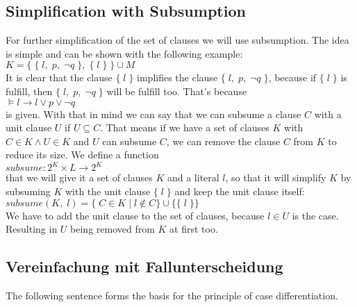 \subsection{Simplification with Subsumption}
For further simplification of the set of clauses we will use subsumption. The idea is simple and can be shown with the following example:
\\
\hspace*{1.3cm}
$K = \{\; \{\; l,\; p,\; \neg q \;\},\; \{\; l\; \}\; \} \cup M$
\\[0.2cm]
It is clear that the clause $\{\; l\; \}$ implifies the clause $\{\; l,\; p,\; \neg q \;\}$, because if $\{\; l\; \}$ is fulfill, then $\{\; l,\; p,\; \neg q \;\}$ will be fulfill too. That's because
\\
\hspace*{1.3cm}
$\models l \to l \lor p \lor \neg q$
\\[0.2cm]
is given. With that in mind we can say that we can subsume a clause $C$ with a unit clause $U$ if $U \subseteq C$. That means if we have a set of clauses $K$ with $C \in K \land U \in K$ and $U$ can subsume $C$, we can remove the clause $C$ from $K$ to reduce its size. We define a function
\\
\hspace*{1.3cm}
$subsume: 2^{K} \times L \to 2^{K}$
\\[0.2cm]
that we will give it a set of clauses $K$ and a literal $l$, so that it will simplify $K$ by subsuming $K$ with the unit clause $\{\; l\; \}$ and keep the unit clause itself:
\\
\hspace*{1.3cm}
$subsume(K,\; l) = \{\; C \in K\; |\; l \notin C\} \cup \{\{\; l\; \}\}$
\\[0.2cm]
We have to add the unit clause to the set of clauses, because $l \in U$ is the case. Resulting in $U$ being removed from $K$ at first too.

\subsection{Vereinfachung mit Fallunterscheidung}
The following sentence forms the basis for the principle of case differentiation. %
